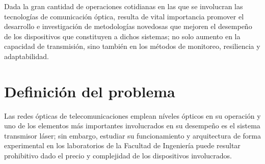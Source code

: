 Dada la gran cantidad de operaciones cotidianas en las que se involucran las tecnologías de comunicación óptica, resulta de vital importancia promover el desarrollo e investigación de metodologías novedosas que mejoren el desempeño de los dispositivos que constituyen a dichos sistemas; no solo aumento en la capacidad de transmisión, sino también en los métodos de monitoreo, resiliencia y adaptabilidad.



    




\section{Definición del problema}

Las redes ópticas de telecomunicaciones emplean níveles ópticos en su operación y uno de los elementos más importantes involucrados en su desempeño es el sistema transmisor láser; sin embargo, estudiar su funcionamiento y arquitectura de forma experimental en los laboratorios de la Facultad de Ingeniería puede resultar prohibitivo dado el precio y complejidad de los dispositivos involucrados.

